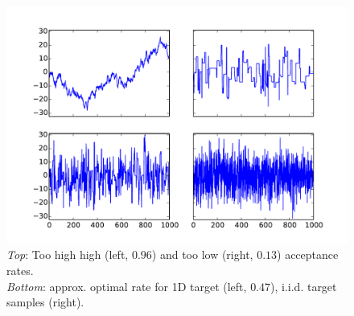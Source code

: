 \begin{figure}[htbp]
\begin{center}
\includegraphics[width=\textwidth]{Figures/Acceptance_rates_high_low_optimal_iid.pdf}
\caption{\emph{Top}: Too high high (left, $0.96$) and too low (right, $0.13$) acceptance rates. \\\emph{Bottom}: approx. optimal rate for 1D target (left, $0.47$), i.i.d. target samples (right).}
\label{fig:acc_rates_high_low_opt}
\end{center}
\end{figure}

